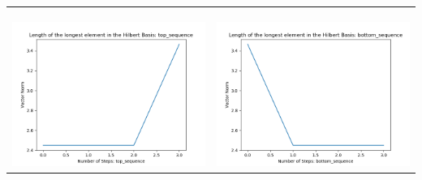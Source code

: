 \documentclass[10pt]{article}
\begin{document}
\begin{tabular}{c|c}
\begin{minipage}{.45\textwidth}
\end{minipage} \\ \\
\hline \\\begin{minipage}{.45\textwidth}
\includegraphics[width=\textwidth]{"DATA/5d/5 generators 1 bound I/top_sequence LENGTH"}
\end{minipage} &
\begin{minipage}{.45\textwidth}
\includegraphics[width=\textwidth]{"DATA/5d/5 generators 1 bound I bottomup/bottom_sequence LENGTH"}
\end{minipage}
\end{tabular}
\end{document}
